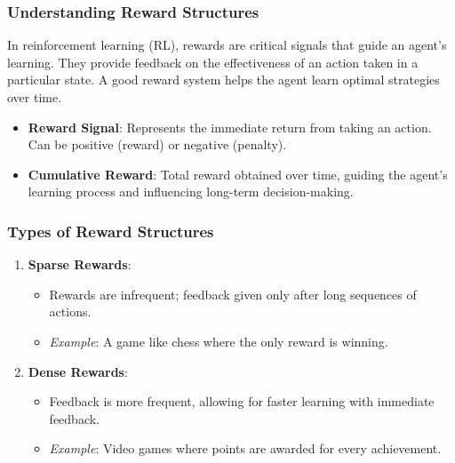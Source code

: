 \documentclass[aspectratio=169]{beamer}
\begin{document}
\begin{frame}[fragile]
    \frametitle{Understanding Reward Structures}
    
    In reinforcement learning (RL), rewards are critical signals that guide an agent's learning. They provide feedback on the effectiveness of an action taken in a particular state. A good reward system helps the agent learn optimal strategies over time.

    \begin{itemize}
        \item \textbf{Reward Signal}: Represents the immediate return from taking an action. Can be positive (reward) or negative (penalty).
        \item \textbf{Cumulative Reward}: Total reward obtained over time, guiding the agent’s learning process and influencing long-term decision-making.
    \end{itemize}
\end{frame}

\begin{frame}[fragile]
    \frametitle{Types of Reward Structures}

    \begin{enumerate}
        \item \textbf{Sparse Rewards}:
            \begin{itemize}
                \item Rewards are infrequent; feedback given only after long sequences of actions. 
                \item \textit{Example}: A game like chess where the only reward is winning.
            \end{itemize}
        
        \item \textbf{Dense Rewards}:
            \begin{itemize}
                \item Feedback is more frequent, allowing for faster learning with immediate feedback.
                \item \textit{Example}: Video games where points are awarded for every achievement.
            \end{itemize}
    \end{enumerate}
\end{frame}
\end{document}
